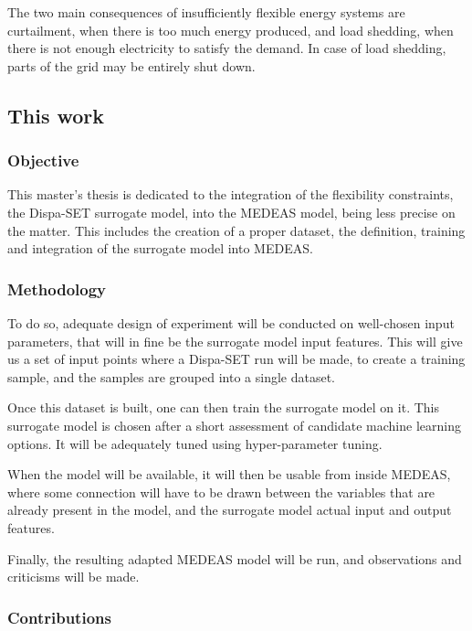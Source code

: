 The two main consequences of insufficiently flexible energy systems are curtailment, when there is too much energy produced, and load shedding, when there is not enough electricity to satisfy the demand. In case of load shedding, parts of the grid may be entirely shut down.

\subsection{This work}

\subsubsection{Objective}

This master's thesis is dedicated to the integration of the flexibility constraints, the Dispa-SET surrogate model, into the MEDEAS model, being less precise on the matter. This includes the creation of a proper dataset, the definition, training and integration of the surrogate model into MEDEAS.

\subsubsection{Methodology}

To do so, adequate design of experiment will be conducted on well-chosen input parameters, that will in fine be the surrogate model input features. This will give us a set of input points where a Dispa-SET run will be made, to create a training sample, and the samples are grouped into a single dataset.

Once this dataset is built, one can then train the surrogate model on it. This surrogate model is chosen after a short assessment of candidate machine learning options. It will be adequately tuned using hyper-parameter tuning.

When the model will be available, it will then be usable from inside MEDEAS, where some connection will have to be drawn between the variables that are already present in the model, and the surrogate model actual input and output features.

Finally, the resulting adapted MEDEAS model will be run, and observations and criticisms will be made.

\subsubsection{Contributions}

